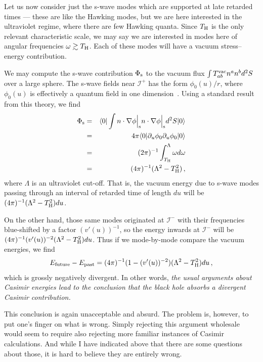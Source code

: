 \documentclass[
%
draft    %
,numberedheadings 
,bibliocites
  ]
  {aipproc}
\newcommand{\scrif}{{{\mathscr I}^{+}}}
\newcommand{\scrip}{{{\mathscr I}^{-}}}
\begin{document}
Let us now consider just the s-wave modes which are supported at late retarded times --- these are like the Hawking modes, but we are here interested in the ultraviolet regime, where there are few Hawking quanta.  Since $T_{\rm H}$ is the only relevant characteristic scale, we may say we are interested in modes here of angular frequencies $\omega\gtrsim T_{\rm H}$.  Each of these modes will have a vacuum stress--energy contribution.

We may compute the s-wave contribution $\Phi _{\rm s}$
to the 
vacuum flux $\int T_{ab}^{\rm vac} n^an^b d^2S$ over a large sphere.  The s-wave fields near $\scrif$ has the form $\phi _0(u)/r$, where $\phi _0(u)$ is effectively a quantum field in one dimension~\citep{Helfer:2003va}.  Using a standard result from this theory, we find
\begin{eqnarray}
  \Phi _{\rm s}&=&\langle 0|\int n\cdot\nabla\phi \Bigr|_{\rm s} 
n\cdot\nabla\phi \Bigr|_{\rm s} d^2S|0\rangle\nonumber\\
  &=&4\pi\langle 0|\partial _u\phi _0\partial _u\phi _0|0\rangle
  \nonumber\\
&=&(2\pi )^{-1}\int _{T_{\rm H}}^\Lambda\omega d\omega\nonumber\\
&=&(4\pi )^{-1}(\Lambda ^2-T_{\rm H}^2)\, ,
\end{eqnarray}
where $\Lambda$ is an ultraviolet cut-off.
That is, the vacuum energy due to s-wave modes passing through an interval of retarded time of length $du$ will be $(4\pi )^{-1}(\Lambda ^2-T_{\rm H}^2) du$.

On the other hand, those same modes originated at $\scrip$ with their frequencies blue-shifted by a factor $(v'(u))^{-1}$, so the energy inwards at $\scrip$ will be $(4\pi )^{-1}(v'(u))^{-2}(\Lambda ^2 -T_{\rm H}^2) du$.  Thus if we mode-by-mode compare the vacuum energies, we find
\begin{equation}\label{Casdif}
  E_{\rm future}-E_{\rm past} =(4\pi )^{-1}(1-(v'(u))^{-2})(\Lambda ^2-T_{\rm H}^2) du\, ,
\end{equation}
which is grossly negatively divergent.  In other words, {\em the usual arguments about Casimir energies lead to the conclusion that the black hole absorbs a divergent Casimir contribution.}

This conclusion is again unacceptable and absurd.  
The problem is, however, to put one's finger on what is wrong.  Simply rejecting this argument wholesale would seem to require also rejecting more familiar instances of Casimir calculations.  And while I have indicated above that there are some questions about those, it is hard to believe they are entirely wrong.
\end{document}
